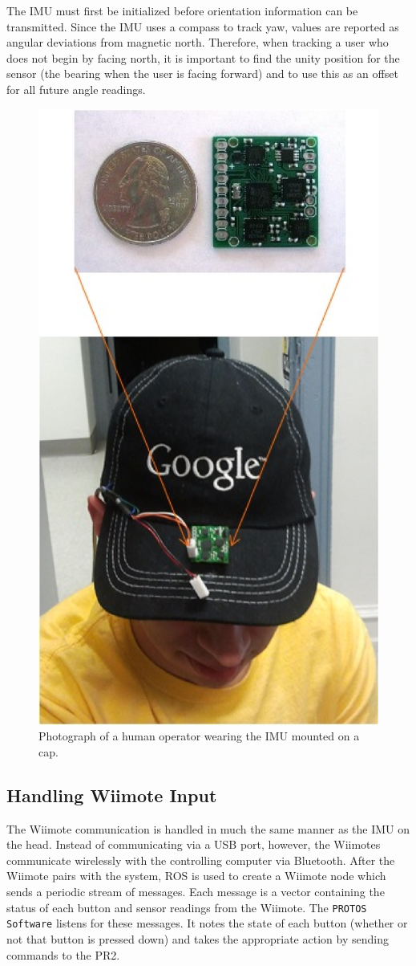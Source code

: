\documentclass{sig-alternate}
\begin{document}
\indent The IMU must first be initialized before orientation information can be transmitted. Since the IMU uses a compass
to track yaw, values are reported as angular deviations from magnetic north.
Therefore, when tracking a user who does not begin by facing north, it is 
important to find the unity position for the sensor (the bearing when 
the user is facing forward) and to use this as an offset for all future angle
readings.

\begin{figure}[htb] 
	\begin{center}
		\includegraphics[width=0.6\linewidth]{imu}
	\end{center}
	\caption{Photograph of a human operator wearing the IMU mounted on a cap.}
	\label{fig:imu}
\end{figure}

\subsection{Handling Wiimote Input}
The Wiimote communication is handled in much the same manner as the IMU on the head.
Instead of communicating via a USB port, however, the Wiimotes communicate wirelessly with the
controlling computer via Bluetooth. After the Wiimote pairs with the system,
ROS is used to create a Wiimote node which 
sends a periodic stream of messages. Each message is a vector containing the
status of each button and sensor readings from the Wiimote. The {\tt PROTOS Software}
listens for these messages. It notes the state of each button (whether or not that button
is pressed down)
and takes the appropriate action by sending commands to the PR2. 
\end{document}
